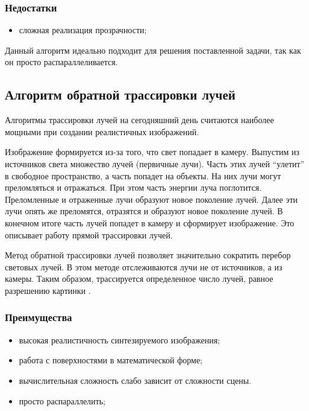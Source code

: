 \subsubsection*{Недостатки}
\begin{itemize}
	\item сложная реализация прозрачности;
\end{itemize}

Данный алгоритм идеально подходит для решения поставленной задачи, так как он просто распараллеливается. 

\subsection{Алгоритм обратной трассировки лучей}
Алгоритмы трассировки лучей на сегодняшний день считаются наиболее мощными при создании реалистичных изображений. 

Изображение формируется из-за того, что свет попадает в камеру. Выпустим из источников света множество лучей (первичные лучи). Часть этих лучей “улетит” в свободное пространство, а часть попадет на объекты. На них лучи могут преломляться и отражаться. При этом часть энергии луча поглотится. Преломленные и отраженные лучи образуют новое поколение лучей. Далее эти лучи опять же преломятся, отразятся и образуют новое поколение лучей. В конечном итоге часть лучей попадет в камеру и сформирует изображение. Это описывает работу прямой трассировки лучей.

Метод обратной трассировки лучей позволяет значительно сократить перебор световых лучей. В этом методе отслеживаются лучи не от источников, а из камеры. Таким образом, трассируется определенное число лучей, равное разрешению картинки \cite{raytrace}.

\subsubsection*{Преимущества}
\begin{itemize}
\item	высокая реалистичность синтезируемого изображения;
\item	работа с поверхностями в математической форме;
\item	вычислительная сложность слабо зависит от сложности сцены.
\item   просто распараллелить;
\end{itemize}

